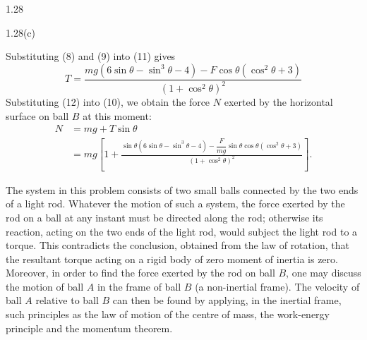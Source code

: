 \begin{solution}{1.28}
\begin{figbox}{1.28(c)}
\end{figbox}
Substituting (8) and (9) into (11) gives
\begin{equation}
T=\frac{mg(6\sin\theta-\sin^3\theta-4)-F\cos\theta(\cos^2\theta+3)}{(1+\cos^2\theta)^2} \tag{12}
\end{equation}
Substituting (12) into (10), we obtain the force $N$ exerted by the horizontal surface on ball $B$ at this moment:
\begin{align*}
N&=mg+T\sin\theta\\
&=mg\left[1+\frac{\sin\theta(6\sin\theta-\sin^3\theta-4)-\dfrac{F}{mg}\sin\theta\cos\theta(\cos^2\theta+3)}{(1+\cos^2\theta)^2}\right].
\end{align*}

\begin{commentary}
The system in this problem consists of two small balls connected by the two ends of a light rod. Whatever the motion of such a system, the force exerted by the rod on a ball at any instant must be directed along the rod; otherwise its reaction, acting on the two ends of the light rod, would subject the light rod to a torque. This contradicts the conclusion, obtained from the law of rotation, that the resultant torque acting on a rigid body of zero moment of inertia is zero. Moreover, in order to find the force exerted by the rod on ball $B$, one may discuss the motion of ball $A$ in the frame of ball $B$ (a non-inertial frame). The velocity of ball $A$ relative to ball $B$ can then be found by applying, in the inertial frame, such principles as the law of motion of the centre of mass, the work-energy principle and the momentum theorem.
\end{commentary}

\end{solution}

